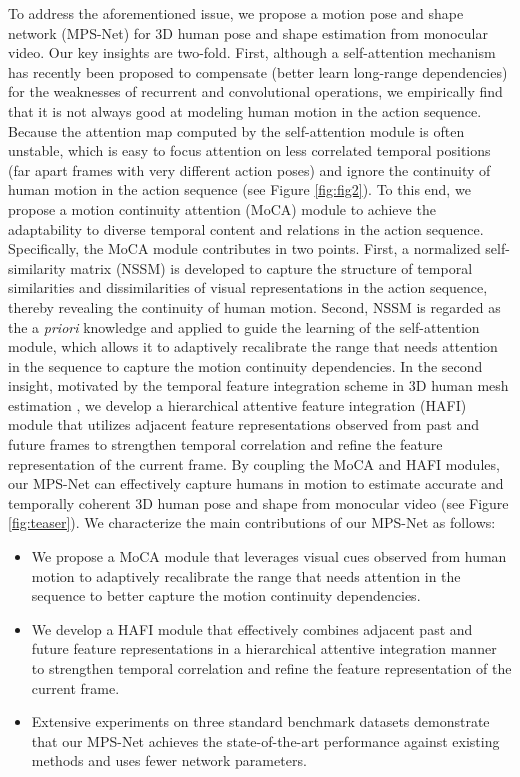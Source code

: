 \documentclass[10pt,twocolumn,letterpaper]{article}
\begin{document}
To address the aforementioned issue, we propose a motion pose and shape network (MPS-Net) for 3D human pose and shape estimation from monocular video. Our key insights are two-fold. First, although a self-attention mechanism \cite{Vaswani2017AttentionIA,Wang2018NonlocalNN} has recently been proposed to compensate (\ie better learn long-range dependencies) for the weaknesses of recurrent and convolutional operations, we empirically find that it is not always good at modeling human motion in the action sequence. Because the attention map computed by the self-attention module is often unstable, which is easy to focus attention on less correlated temporal positions (\ie far apart frames with very different action poses) and ignore the continuity of human motion in the action sequence (see Figure \ref{fig:fig2}). To this end, we propose a motion continuity attention (MoCA) module to achieve the adaptability to diverse temporal content and relations in the action sequence. Specifically, the MoCA module contributes in two points. First, a normalized self-similarity matrix (NSSM) is developed to capture the structure of temporal similarities and dissimilarities of visual representations in the action sequence, thereby revealing the continuity of human motion. Second, NSSM is regarded as the a \emph{priori} knowledge and applied to guide the learning of the self-attention module, which allows it to adaptively recalibrate the range that needs attention in the sequence to capture the motion continuity dependencies.
In the second insight, motivated by the temporal feature integration scheme in 3D human mesh estimation \cite{choi2020beyond}, we develop a hierarchical attentive feature integration (HAFI) module that utilizes adjacent feature representations observed from past and future frames to strengthen temporal correlation and refine the feature representation of the current frame. By coupling the MoCA and HAFI modules, our MPS-Net can effectively capture humans in motion to estimate accurate and temporally coherent 3D human pose and shape from monocular video (see Figure \ref{fig:teaser}). We characterize the main contributions of our MPS-Net as follows:\vspace{-9pt}


\begin{itemize}
\item We propose a MoCA module that leverages visual cues observed from human motion to adaptively recalibrate the range that needs attention in the sequence to better capture the motion continuity dependencies.\vspace{-6pt}
\item We develop a HAFI module that effectively combines adjacent past and future feature representations in a hierarchical attentive integration manner to strengthen temporal correlation and refine the feature representation of the current frame.\vspace{-7pt}
\item Extensive experiments on three standard benchmark datasets demonstrate that our MPS-Net achieves the state-of-the-art performance against existing methods and uses fewer network parameters.\vspace{-6pt}
\end{itemize}
\end{document}
